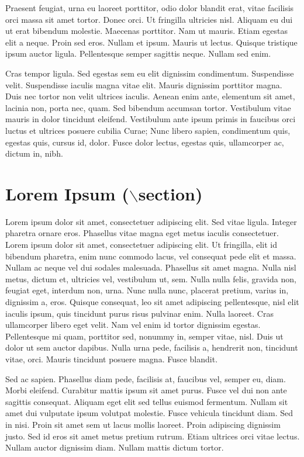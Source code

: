 \documentclass[c0paper, colorbacktitle, accentcolor=tud9c]{tudposter}
\begin{document}
\begin{multicols}{3}
    Praesent feugiat, urna eu laoreet porttitor, odio dolor blandit erat, vitae facilisis orci massa sit amet tortor. Donec orci. Ut fringilla ultricies nisl. Aliquam eu dui ut erat bibendum molestie. Maecenas porttitor. Nam ut mauris. Etiam egestas elit a neque. Proin sed eros. Nullam et ipsum. Mauris ut lectus. Quisque tristique ipsum auctor ligula. Pellentesque semper sagittis neque. Nullam sed enim.%

    Cras tempor ligula. Sed egestas sem eu elit dignissim condimentum. Suspendisse velit. Suspendisse iaculis magna vitae elit. Mauris dignissim porttitor magna. Duis nec tortor non velit ultrices iaculis. Aenean enim ante, elementum sit amet, lacinia non, porta nec, quam. Sed bibendum accumsan tortor. Vestibulum vitae mauris in dolor tincidunt eleifend. Vestibulum ante ipsum primis in faucibus orci luctus et ultrices posuere cubilia Curae; Nunc libero sapien, condimentum quis, egestas quis, cursus id, dolor. Fusce dolor lectus, egestas quis, ullamcorper ac, dictum in, nibh.%

    \section*{Lorem Ipsum ($\backslash$section)}
    Lorem ipsum dolor sit amet, consectetuer adipiscing elit. Sed vitae ligula. Integer pharetra ornare eros. Phasellus vitae magna eget metus iaculis consectetuer. Lorem ipsum dolor sit amet, consectetuer adipiscing elit. Ut fringilla, elit id bibendum pharetra, enim nunc commodo lacus, vel consequat pede elit et massa. Nullam ac neque vel dui sodales malesuada. Phasellus sit amet magna. Nulla nisl metus, dictum et, ultricies vel, vestibulum ut, sem. Nulla nulla felis, gravida non, feugiat eget, interdum non, urna. Nunc nulla nunc, placerat pretium, varius in, dignissim a, eros. Quisque consequat, leo sit amet adipiscing pellentesque, nisl elit iaculis ipsum, quis tincidunt purus risus pulvinar enim. Nulla laoreet. Cras ullamcorper libero eget velit. Nam vel enim id tortor dignissim egestas. Pellentesque mi quam, porttitor sed, nonummy in, semper vitae, nisl. Duis ut dolor ut sem auctor dapibus. Nulla urna pede, facilisis a, hendrerit non, tincidunt vitae, orci. Mauris tincidunt posuere magna. Fusce blandit.%

    Sed ac sapien. Phasellus diam pede, facilisis at, faucibus vel, semper eu, diam. Morbi eleifend. Curabitur mattis ipsum sit amet purus. Fusce vel dui non ante sagittis consequat. Aliquam eget elit sed tellus euismod fermentum. Nullam sit amet dui vulputate ipsum volutpat molestie. Fusce vehicula tincidunt diam. Sed in nisi. Proin sit amet sem ut lacus mollis laoreet. Proin adipiscing dignissim justo. Sed id eros sit amet metus pretium rutrum. Etiam ultrices orci vitae lectus. Nullam auctor dignissim diam. Nullam mattis dictum tortor.
    

\end{multicols}
\end{document}
